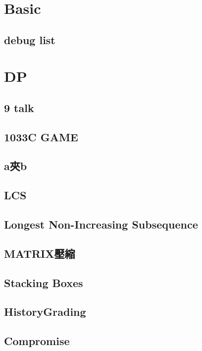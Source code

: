 \section{Basic}

\subsection{debug list}



\section{DP}

\subsection{9 talk}

\subsection{1033C GAME}

\subsection{a夾b}

\subsection{LCS}

\subsection{Longest Non-Increasing Subsequence}

\subsection{MATRIX壓縮}

\subsection{Stacking Boxes}

\subsection{HistoryGrading}

\subsection{Compromise}

